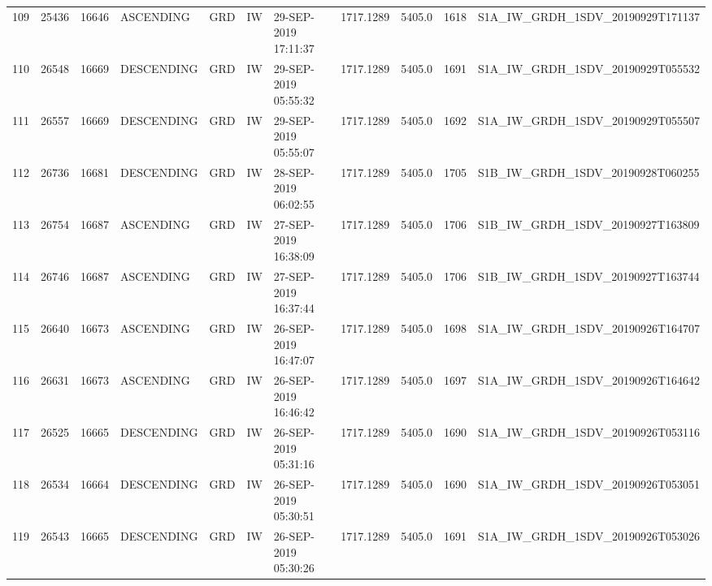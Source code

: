 \begin{tabular}{lrrllllllll}
109 &  25436 &   16646 &   ASCENDING &          GRD &              IW &  29-SEP-2019 17:11:37 &                  1717.1289 &          5405.0 &       1618 &  S1A\_IW\_GRDH\_1SDV\_20190929T171137 \\
110 &  26548 &   16669 &  DESCENDING &          GRD &              IW &  29-SEP-2019 05:55:32 &                  1717.1289 &          5405.0 &       1691 &  S1A\_IW\_GRDH\_1SDV\_20190929T055532 \\
111 &  26557 &   16669 &  DESCENDING &          GRD &              IW &  29-SEP-2019 05:55:07 &                  1717.1289 &          5405.0 &       1692 &  S1A\_IW\_GRDH\_1SDV\_20190929T055507 \\
112 &  26736 &   16681 &  DESCENDING &          GRD &              IW &  28-SEP-2019 06:02:55 &                  1717.1289 &          5405.0 &       1705 &  S1B\_IW\_GRDH\_1SDV\_20190928T060255 \\
113 &  26754 &   16687 &   ASCENDING &          GRD &              IW &  27-SEP-2019 16:38:09 &                  1717.1289 &          5405.0 &       1706 &  S1B\_IW\_GRDH\_1SDV\_20190927T163809 \\
114 &  26746 &   16687 &   ASCENDING &          GRD &              IW &  27-SEP-2019 16:37:44 &                  1717.1289 &          5405.0 &       1706 &  S1B\_IW\_GRDH\_1SDV\_20190927T163744 \\
115 &  26640 &   16673 &   ASCENDING &          GRD &              IW &  26-SEP-2019 16:47:07 &                  1717.1289 &          5405.0 &       1698 &  S1A\_IW\_GRDH\_1SDV\_20190926T164707 \\
116 &  26631 &   16673 &   ASCENDING &          GRD &              IW &  26-SEP-2019 16:46:42 &                  1717.1289 &          5405.0 &       1697 &  S1A\_IW\_GRDH\_1SDV\_20190926T164642 \\
117 &  26525 &   16665 &  DESCENDING &          GRD &              IW &  26-SEP-2019 05:31:16 &                  1717.1289 &          5405.0 &       1690 &  S1A\_IW\_GRDH\_1SDV\_20190926T053116 \\
118 &  26534 &   16664 &  DESCENDING &          GRD &              IW &  26-SEP-2019 05:30:51 &                  1717.1289 &          5405.0 &       1690 &  S1A\_IW\_GRDH\_1SDV\_20190926T053051 \\
119 &  26543 &   16665 &  DESCENDING &          GRD &              IW &  26-SEP-2019 05:30:26 &                  1717.1289 &          5405.0 &       1691 &  S1A\_IW\_GRDH\_1SDV\_20190926T053026 \\

\end{tabular}
